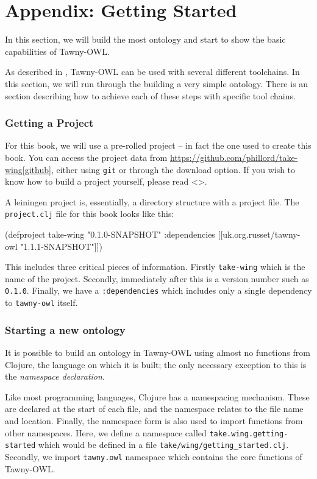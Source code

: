 \chapter{Appendix: Getting Started}

In this section, we will build the most ontology and start to show the
basic capabilities of Tawny-OWL.

As described in \label{/the/environment-the-environment}, Tawny-OWL can be
used with several different toolchains. In this section, we will run
through the building a very simple ontology. There is an section describing
how to achieve each of these steps with specific tool chains.

\subsection{Getting a Project}
\label{sec-4-1}

For this book, we will use a pre-rolled project -- in fact the one used
to create this book. You can access the project data from
\url{https://github.com/phillord/take-wing[github}], either using \texttt{git} or
through the download option. If you wish to know how to build a project
yourself, please read <>.

A leiningen project is, essentially, a directory structure with a
project file. The \texttt{project.clj} file for this book looks like this:

\begin{clojure}
(defproject take-wing "0.1.0-SNAPSHOT"
  :dependencies [[uk.org.russet/tawny-owl "1.1.1-SNAPSHOT"]])
\end{clojure}

This includes three critical pieces of information. Firstly \texttt{take-wing}
which is the name of the project. Secondly, immediately after this is a
version number such as \texttt{0.1.0}. Finally, we have a \texttt{:dependencies} which
includes only a single dependency to \texttt{tawny-owl} itself.


\subsection{Starting a new ontology}
\label{sec-4-2}

It is possible to build an ontology in Tawny-OWL using almost no
functions from Clojure, the language on which it is built; the only
necessary exception to this is the \emph{namespace declaration}.

Like most programming languages, Clojure has a namespacing mechanism.
These are declared at the start of each file, and the namespace relates
to the file name and location. Finally, the namespace form is also used
to import functions from other namespaces. Here, we define a namespace
called \texttt{take.wing.getting-started} which would be defined in a file
\texttt{take/wing/getting\_started.clj}. Secondly, we import \texttt{tawny.owl}
namespace which contains the core functions of Tawny-OWL.


